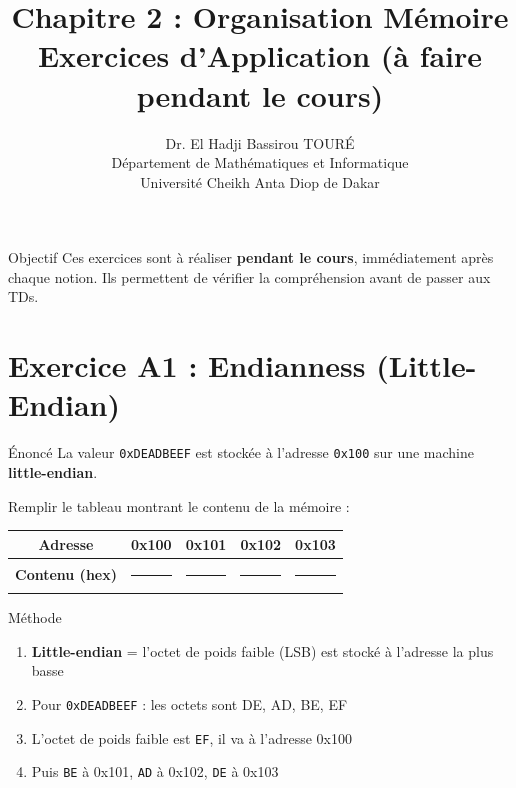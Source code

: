 \documentclass[10pt,a4paper]{article}
\title{\textbf{Chapitre 2 : Organisation Mémoire}\\
\large Exercices d'Application (à faire pendant le cours)}
\author{Dr. El Hadji Bassirou TOURÉ\\
Département de Mathématiques et Informatique\\
Université Cheikh Anta Diop de Dakar}
\date{}
\begin{document}
\maketitle

\begin{infobox}{Objectif}
Ces exercices sont à réaliser \textbf{pendant le cours}, immédiatement après chaque notion. Ils permettent de vérifier la compréhension avant de passer aux TDs.
\end{infobox}

\section{Exercice A1 : Endianness (Little-Endian)}

\begin{exercicebox}{Énoncé}
La valeur \texttt{0xDEADBEEF} est stockée à l'adresse \texttt{0x100} sur une machine \textbf{little-endian}.

Remplir le tableau montrant le contenu de la mémoire :
\end{exercicebox}

\vspace{0.5em}

\begin{center}
\renewcommand{\arraystretch}{1.5}
\begin{tabular}{|c|c|c|c|c|}
\hline
\textbf{Adresse} & 0x100 & 0x101 & 0x102 & 0x103 \\
\hline
\textbf{Contenu (hex)} & \rule{1.5cm}{0.4pt} & \rule{1.5cm}{0.4pt} & \rule{1.5cm}{0.4pt} & \rule{1.5cm}{0.4pt} \\
\hline
\end{tabular}
\end{center}

\begin{examplebox}{Méthode}
\begin{enumerate}
    \item \textbf{Little-endian} = l'octet de poids faible (LSB) est stocké à l'adresse la plus basse
    \item Pour \texttt{0xDEADBEEF} : les octets sont DE, AD, BE, EF
    \item L'octet de poids faible est \texttt{EF}, il va à l'adresse 0x100
    \item Puis \texttt{BE} à 0x101, \texttt{AD} à 0x102, \texttt{DE} à 0x103
\end{enumerate}
\end{examplebox}
\end{document}
